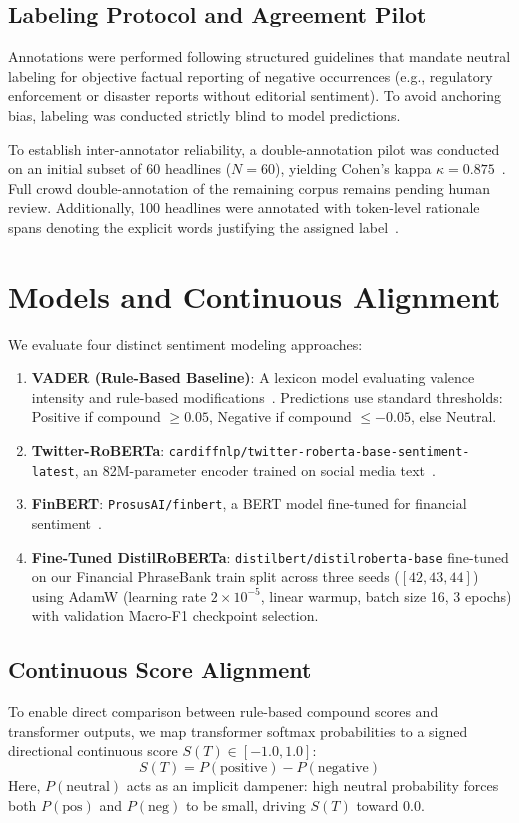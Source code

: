 \documentclass[10pt,twocolumn,letterpaper]{article}
\begin{document}
\subsection{Labeling Protocol and Agreement Pilot}
Annotations were performed following structured guidelines that mandate neutral labeling for objective factual reporting of negative occurrences (e.g., regulatory enforcement or disaster reports without editorial sentiment). To avoid anchoring bias, labeling was conducted strictly blind to model predictions.

To establish inter-annotator reliability, a double-annotation pilot was conducted on an initial subset of 60 headlines ($N=60$), yielding Cohen's kappa $\kappa = 0.875$~\cite{cohen1960coefficient}. Full crowd double-annotation of the remaining corpus remains pending human review. Additionally, 100 headlines were annotated with token-level rationale spans denoting the explicit words justifying the assigned label~\cite{deyoung2020eraser}.

\section{Models and Continuous Alignment}

We evaluate four distinct sentiment modeling approaches:
\begin{enumerate}
    \item \textbf{VADER (Rule-Based Baseline)}: A lexicon model evaluating valence intensity and rule-based modifications~\cite{hutto2014vader}. Predictions use standard thresholds: Positive if compound $\ge 0.05$, Negative if compound $\le -0.05$, else Neutral.
    \item \textbf{Twitter-RoBERTa}: \texttt{cardiffnlp/twitter-roberta-base-sentiment-latest}, an 82M-parameter encoder trained on social media text~\cite{barbieri2020tweeteval}.
    \item \textbf{FinBERT}: \texttt{ProsusAI/finbert}, a BERT model fine-tuned for financial sentiment~\cite{araci2019finbert}.
    \item \textbf{Fine-Tuned DistilRoBERTa}: \texttt{distilbert/distilroberta-base} fine-tuned on our Financial PhraseBank train split across three seeds ($[42, 43, 44]$) using AdamW (learning rate $2 \times 10^{-5}$, linear warmup, batch size 16, 3 epochs) with validation Macro-F1 checkpoint selection.
\end{enumerate}

\subsection{Continuous Score Alignment}
To enable direct comparison between rule-based compound scores and transformer outputs, we map transformer softmax probabilities to a signed directional continuous score $S(T) \in [-1.0, 1.0]$:
\begin{equation}
    S(T) = P(\text{positive}) - P(\text{negative})
    \label{eq:score}
\end{equation}
Here, $P(\text{neutral})$ acts as an implicit dampener: high neutral probability forces both $P(\text{pos})$ and $P(\text{neg})$ to be small, driving $S(T)$ toward 0.0.
\end{document}
